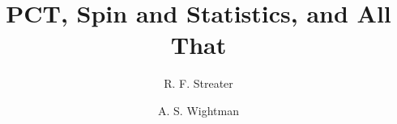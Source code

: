 \documentclass[11pt,a4paper]{article}
\title{PCT, Spin and Statistics, and All That}
\author[a]{R. F. Streater}
\author[b]{A. S. Wightman}
\affiliation[a]{Kings College London}
\affiliation[b]{Princeton University}
\begin{document}
\maketitle
\pretocmd{\section}{\clearpage}{}{}
\raggedbottom

%






%


%






%







%
%




\appendix
%




\end{document}
